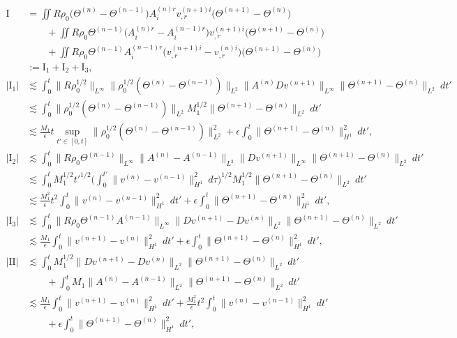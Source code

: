 \documentclass[12pt,a4paper]{amsart}
\numberwithin{equation}{section}
\theoremstyle{plain}
\theoremstyle{definition}
\begin{document}
\begin{align*}
\mathrm{I}&=\iint R\rho_0\Big(\Theta^{(n)}-\Theta^{(n-1)}\Big)A^{(n)r}_iv^{(n+1)i}_{,r} \Big( \Theta^{(n+1)}-\Theta^{(n)}\Big)\\
&\qquad +\iint R\rho_0\Theta^{(n-1)}\Big(A^{(n)r}_i-A^{(n-1)r}_i\Big)v^{(n+1)i}_{,r} \Big( \Theta^{(n+1)}-\Theta^{(n)}\Big)\\
&\qquad +\iint R\rho_0\Theta^{(n-1)}A^{(n-1)r}_i\Big(v^{(n+1)i}_{,r} -v^{(n)i}_{,r} \Big)\Big( \Theta^{(n+1)}-\Theta^{(n)}\Big)\\
&:=\mathrm{I}_1+ \mathrm{I}_2+\mathrm{I}_3,\\
|\mathrm{I}_1|&\lesssim \int_{0}^{t}\|R\rho_0^{1/2}\|_{L^{\infty}}\|\rho_0^{1/2}(\Theta^{(n)}-\Theta^{(n-1)})\|_{L^2}\|A^{(n)}Dv^{(n+1)}\|_{L^{\infty}} \|\Theta^{(n+1)}-\Theta^{(n)}\|_{L^{2}} \ dt'\\
&\lesssim \int_{0}^{t}\|\rho_0^{1/2}(\Theta^{(n)}-\Theta^{(n-1)})\|_{L^2}M_1^{1/2}\|\Theta^{(n+1)}-\Theta^{(n)}\|_{L^{2}} \ dt'\\
&\lesssim \frac{M_1}{\epsilon}t\sup\limits_{t'\in[0,t]}\|\rho_{0}^{1/2}(\Theta^{(n)}-\Theta^{(n-1)})\|_{L^{2}}^2 +\epsilon\int_{0}^{t} \|\Theta^{(n+1)}-\Theta^{(n)}\|_{H^1}^2 \ dt',\\
|\mathrm{I}_2|&\lesssim \int_{0}^{t}\|R\rho_0\Theta^{(n-1)}\|_{L^{\infty}} \|A^{(n)}-A^{(n-1)}\|_{L^2}\|Dv^{(n+1)}\|_{L^{\infty}} \|\Theta^{(n+1)}-\Theta^{(n)}\|_{L^{2}} \ dt'\\
&\lesssim \int_{0}^{t}M_1^{1/2} t'^{1/2} \Big(\int_{0}^{t'} \|v^{(n)}-v^{(n-1)}\|_{H^1}^2\ d\tau \Big)^{1/2} M_1^{1/2} \|\Theta^{(n+1)}-\Theta^{(n)}\|_{L^{2}} \ dt'\\
&\lesssim \frac{M_1^2}{\epsilon}t^2\int_{0}^{t} \|v^{(n)}-v^{(n-1)}\|_{H^1}^2 \ dt' +\epsilon\int_{0}^{t} \|\Theta^{(n+1)}-\Theta^{(n)}\|_{H^1}^2 \ dt',\\
|\mathrm{I}_3|&\lesssim
\int_{0}^{t} \|R\rho_0\Theta^{(n-1)}A^{(n-1)}\|_{L^{\infty} } \|Dv^{(n+1)}-Dv^{(n)} \|_{L^2} \|\Theta^{(n+1)}-\Theta^{(n)}\|_{L^2}\ dt'\\
&\lesssim \frac{M_1}{\epsilon}\int_{0}^{t}  \|v^{(n+1)}-v^{(n)} \|_{H^1}^2\ dt'+\epsilon\int_{0}^{t}\|\Theta^{(n+1)}-\Theta^{(n)} \|_{H^1}^2 \ dt',\\
|\mathrm{II}|&\lesssim \int_{0}^{t} M_1^{1/2} \|Dv^{(n+1)}-Dv^{(n)}\|_{L^{2}}\|\Theta^{(n+1)}-\Theta^{(n)}\|_{L^2} \ dt'\\
&\qquad+\int_{0}^{t} M_1 \|A^{(n)}-A^{(n-1)}\|_{L^{2}}\|\Theta^{(n+1)}-\Theta^{(n)}\|_{L^2} \ dt'\\
&\lesssim \frac{M_1}{\epsilon}\int_{0}^{t}  \|v^{(n+1)}-v^{(n)} \|_{H^1}^2\ dt'+\frac{M_1^2}{\epsilon}t^2\int_{0}^{t} \|v^{(n)}-v^{(n-1)}\|_{H^1}^2 \ dt'\\
&\qquad+\epsilon\int_{0}^{t}\|\Theta^{(n+1)}-\Theta^{(n)} \|_{H^1}^2 \ dt',
\end{align*}
\end{document}
